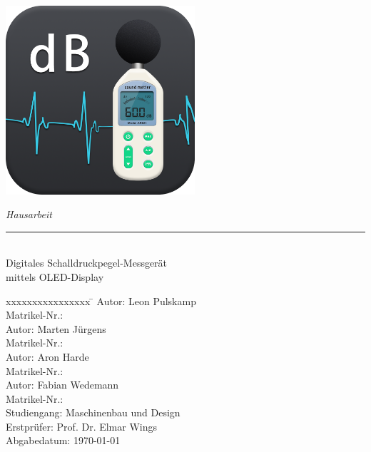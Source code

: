 %
%

\begin{titlepage}
    
    \begin{flushleft} 
        \includegraphics[width=7cm]{General/Logo.png}
    \end{flushleft} 
    
    \begin{flushright}
        \vspace{0.1cm}
        \LARGE \textsl{Hausarbeit}\\
        \rule{0.6\textwidth}{0.4pt} ~\\
        \vspace{0.5cm}
        \textsf{\LARGE Digitales Schalldruckpegel-Messgerät}\\
        \textsf{\LARGE mittels OLED-Display}
    \end{flushright}
    
    \vspace{0.5cm}
    \large
    \begin{tabbing}
        xxxxxxxxxxxxxxxx \= \kill
        Autor: \> Leon Pulskamp \\
        Matrikel-Nr.:  \\
          Autor: \> Marten Jürgens \\
        Matrikel-Nr.:  \\
          Autor: \> Aron Harde \\
        Matrikel-Nr.:  \\
          Autor: \> Fabian Wedemann \\
        Matrikel-Nr.:  \\
        Studiengang: \> Maschinenbau und Design \\ [0.5cm]
        Erstprüfer: \> Prof. Dr. Elmar Wings \\
        Abgabedatum: \> \today \\
    \end{tabbing}
    

\end{titlepage}
